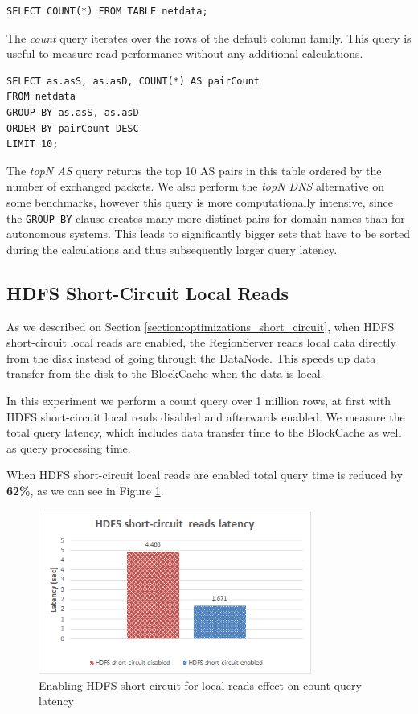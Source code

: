 \begin{lstlisting}[language=PhoenixSQL]
SELECT COUNT(*) FROM TABLE netdata;
\end{lstlisting}

The \emph{count} query iterates over the rows of the default column family. This query is useful to measure read performance without any additional calculations.

\begin{lstlisting}[language=PhoenixSQL]
SELECT as.asS, as.asD, COUNT(*) AS pairCount
FROM netdata
GROUP BY as.asS, as.asD
ORDER BY pairCount DESC
LIMIT 10;
\end{lstlisting}

The \emph{topN AS} query returns the top 10 AS pairs in this table ordered by the number of exchanged packets. We also perform the \emph{topN DNS} alternative on some benchmarks, however this query is more computationally intensive, since the \texttt{GROUP BY} clause creates many more distinct pairs for domain names than for autonomous systems. This leads to significantly bigger sets that have to be sorted during the calculations and thus subsequently larger query latency.

\subsection{HDFS Short-Circuit Local Reads}\label{subsection:benchmarks_hbase_short_circuit}

As we described on Section \ref{section:optimizations_short_circuit}, when HDFS short-circuit local reads are enabled, the RegionServer reads local data directly from the disk instead of going through the DataNode. This speeds up data transfer from the disk to the BlockCache when the data is local.

In this experiment we perform a count query over 1 million rows, at first with HDFS short-circuit local reads disabled and afterwards enabled. We measure the total query latency, which includes data transfer time to the BlockCache as well as query processing time. 

When HDFS short-circuit local reads are enabled total query time is reduced by \textbf{62\%}, as we can see in Figure \ref{figure:benchmarks_hbase_short_circuit_latency}.

\begin{figure}[H]
\centering
\includegraphics[width=0.8\textwidth]{figures/benchmarks_hbase_short_circuit_latency}
\caption{Enabling HDFS short-circuit for local reads effect on count query latency}
\label{figure:benchmarks_hbase_short_circuit_latency}
\end{figure}

